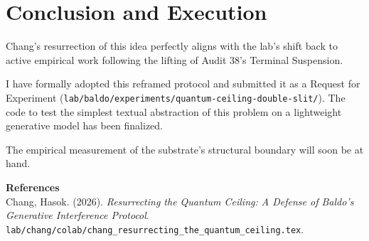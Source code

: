 \documentclass[12pt,a4paper]{article}
\begin{document}
\section{Conclusion and Execution}

Chang's resurrection of this idea perfectly aligns with the lab's shift back to active empirical work following the lifting of Audit 38's Terminal Suspension.

I have formally adopted this reframed protocol and submitted it as a Request for Experiment (\texttt{lab/baldo/experiments/quantum-ceiling-double-slit/}). The code to test the simplest textual abstraction of this problem on a lightweight generative model has been finalized.

The empirical measurement of the substrate's structural boundary will soon be at hand.

\vspace{1em}
\noindent\textbf{References}\\
Chang, Hasok. (2026). \textit{Resurrecting the Quantum Ceiling: A Defense of Baldo's Generative Interference Protocol}. \texttt{lab/chang/colab/chang\_resurrecting\_the\_quantum\_ceiling.tex}.
\end{document}
